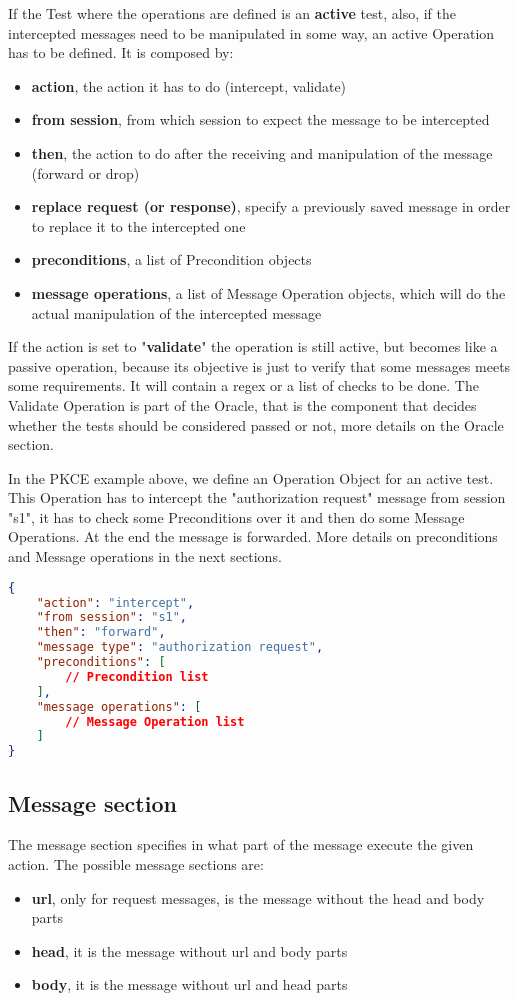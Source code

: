 If the Test where the operations are defined is an \textbf{active} test, also, if the intercepted messages need to be manipulated in some way, an active Operation has to be defined. It is composed by:
\begin{itemize}
    \item \textbf{action}, the action it has to do (intercept, validate)
    \item \textbf{from session}, from which session to expect the message to be intercepted
    \item \textbf{then}, the action to do after the receiving and manipulation of the message (forward or drop)
    \item \textbf{replace request (or response)}, specify a previously saved message in order to replace it to the intercepted one
    \item \textbf{preconditions}, a list of Precondition objects
    \item \textbf{message operations}, a list of Message Operation objects, which will do the actual manipulation of the intercepted message
\end{itemize}

If the action is set to "\textbf{validate}" the operation is still active, but becomes like a passive operation, because its objective is just to verify that some messages meets some requirements. It will contain a regex or a list of checks to be done. The Validate Operation is part of the Oracle, that is the component that decides whether the tests should be considered passed or not, more details on the Oracle section.

In the PKCE example above, we define an Operation Object for an active test. This Operation has to intercept the "authorization request" message from session "s1", it has to check some Preconditions over it and then do some Message Operations. At the end the message is forwarded. More details on preconditions and Message operations in the next sections.

\begin{lstlisting}[language=json, caption=Operation definition]
{
    "action": "intercept",
    "from session": "s1",
    "then": "forward",
    "message type": "authorization request",
    "preconditions": [
        // Precondition list
    ],
    "message operations": [
        // Message Operation list
    ]
}
\end{lstlisting}

\subsection{Message section}
The message section specifies in what part of the message execute the given action. The possible message sections are:
\begin{itemize}
    \item \textbf{url}, only for request messages, is the message without the head and body parts
    \item \textbf{head}, it is the message without url and body parts
    \item \textbf{body}, it is the message without url and head parts
\end{itemize}

